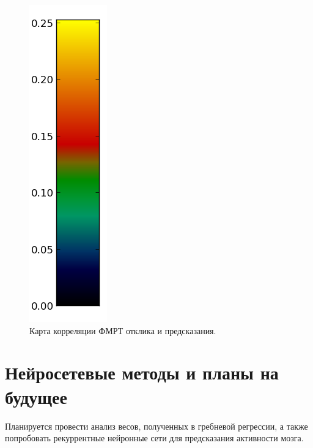\documentclass[pdftex,ptm,12pt,a4paper]{report}
\theoremstyle{definition}
\begin{document}
\begin{figure}[h]
\begin{multicols}{4}
\hfill
\includegraphics[scale=0.65]{graphics/slices/colorbar.png}
\end{multicols}
\centering
\caption{Карта корреляции ФМРТ отклика и предсказания.}
\label{slices}
\end{figure}


\section{Нейросетевые методы и планы на будущее}
Планируется провести анализ весов, полученных в гребневой регрессии, а также попробовать рекуррентные нейронные сети для предсказания активности мозга.



\end{document}
